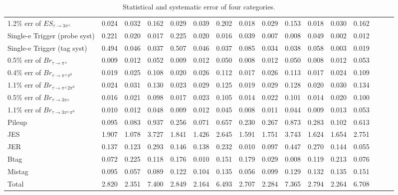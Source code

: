 \begin{sidewaystable}[p]
\begin{tabular}{|l|ccc|ccc|ccc|ccc|ccc|}
  1.2$\%$ err of $ES_{\tau\to3\pi^\pm}$      & 0.024 & 0.032 & 0.162 & 0.029 & 0.039 & 0.202 & 0.018 & 0.029 & 0.153 & 0.018 & 0.030 & 0.162 \\ 
  Single-e Trigger (probe syst)              & 0.221 & 0.020 & 0.017 & 0.225 & 0.020 & 0.016 & 0.039 & 0.007 & 0.008 & 0.049 & 0.002 & 0.012 \\ 
  Single-e Trigger (tag syst)                & 0.494 & 0.046 & 0.037 & 0.507 & 0.046 & 0.037 & 0.085 & 0.034 & 0.038 & 0.058 & 0.003 & 0.019 \\ 
  0.5$\%$ err of $Br_{\tau\to\pi^\pm}$       & 0.009 & 0.012 & 0.052 & 0.009 & 0.012 & 0.050 & 0.008 & 0.012 & 0.050 & 0.008 & 0.012 & 0.053 \\ 
  0.4$\%$ err of $Br_{\tau\to\pi^\pm\pi^0}$  & 0.019 & 0.025 & 0.108 & 0.020 & 0.026 & 0.112 & 0.017 & 0.026 & 0.113 & 0.017 & 0.024 & 0.109 \\ 
  1.1$\%$ err of $Br_{\tau\to\pi^\pm2\pi^0}$ & 0.024 & 0.031 & 0.130 & 0.023 & 0.029 & 0.125 & 0.019 & 0.029 & 0.128 & 0.020 & 0.030 & 0.134 \\ 
  0.5$\%$ err of $Br_{\tau\to3\pi^\pm}$      & 0.016 & 0.021 & 0.098 & 0.017 & 0.023 & 0.105 & 0.014 & 0.022 & 0.101 & 0.014 & 0.020 & 0.100 \\ 
  1.1$\%$ err of $Br_{\tau\to3\pi^\pm\pi^0}$ & 0.010 & 0.012 & 0.048 & 0.009 & 0.012 & 0.045 & 0.008 & 0.011 & 0.044 & 0.009 & 0.013 & 0.053 \\ 
  Pileup                                     & 0.095 & 0.083 & 0.937 & 0.256 & 0.071 & 0.657 & 0.230 & 0.267 & 0.873 & 0.283 & 0.102 & 0.613 \\ 
  JES                                        & 1.907 & 1.078 & 3.727 & 1.841 & 1.426 & 2.645 & 1.591 & 1.751 & 3.743 & 1.624 & 1.654 & 2.751 \\ 
  JER                                        & 0.137 & 0.123 & 0.293 & 0.146 & 0.138 & 0.232 & 0.010 & 0.097 & 0.447 & 0.270 & 0.144 & 0.055 \\ 
  Btag                                       & 0.072 & 0.225 & 0.118 & 0.176 & 0.010 & 0.151 & 0.179 & 0.029 & 0.008 & 0.119 & 0.213 & 0.076 \\ 
  Mistag                                     & 0.095 & 0.057 & 0.089 & 0.122 & 0.104 & 0.135 & 0.056 & 0.099 & 0.129 & 0.132 & 0.135 & 0.151 \\ 
  \hline
  Total                                      & 2.820 & 2.351 & 7.400 & 2.849 & 2.164 & 6.493 & 2.707 & 2.284 & 7.365 & 2.794 & 2.264 & 6.708 \\ 
  \hline
  \end{tabular}
  \caption{ Statistical and systematic error of four categories. }
  \label{tab:syst_alt}
\end{sidewaystable}
